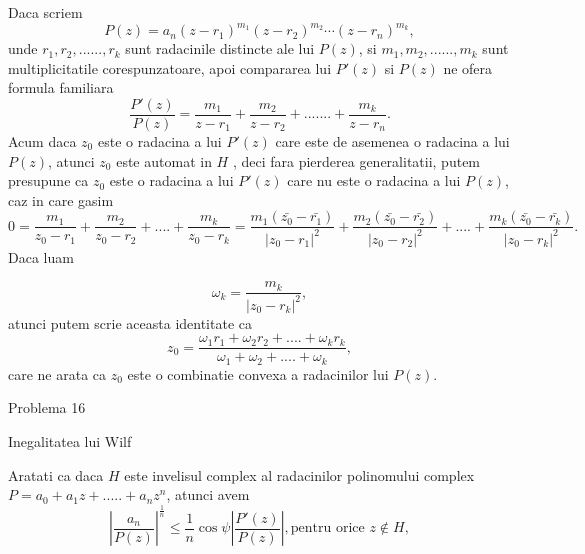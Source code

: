 \documentclass[a4paper,12pt,oneside]{report}
\begin{document}
Daca scriem 
\begin{displaymath}
  P\left ( z \right ) = a_{n}\left ( z - r_{1} \right )^{m_{1}}\left ( z - r_{2} \right )^{m_{2}}\cdots \left ( z - r_{n} \right )^{m_{k}},
\end{displaymath}
unde  \(r_{1} , r_{2}, ......, r_{k}\) sunt radacinile distincte ale lui \(P\left ( z \right )\), si \(m_{1} , m_{2}, ......, m_{k}\) sunt multiplicitatile corespunzatoare, apoi compararea lui \({P}'\left ( z \right )\) si \( P\left ( z \right )\) ne ofera formula familiara
\begin{displaymath}
  \frac{{P}'\left ( z \right ) }{P\left ( z \right )} = \frac{m_{1}}{z - r_{1}} + \frac{m_{2}}{z - r_{2}}+ .......+ \frac{m_{k}}{z - r_{n}} . 
\end{displaymath}
Acum daca \(z_{0}\) este o radacina a lui \({P}'\left ( z \right )\) care este de asemenea o radacina a lui \(P\left ( z \right )\), atunci \(z_{0}\) este automat in \(H\) , deci fara pierderea generalitatii, putem presupune ca \(z_{0}\)  este o radacina a lui  \({P}'\left ( z \right )\) care nu este o radacina a lui \(P\left ( z \right )\), caz in care gasim 
\begin{displaymath}
  0 = \frac{m_{1}}{z_{0} - r_{1}} + \frac{m_{2}}{z_{0} - r_{2}} +....+ \frac{m_{k}}{z_{0} - r_{k}} = \frac{m_{1}\left (\bar{z_{0}} - \bar{r_{1}}\right )}{\left | z_{0}  - r_{1}\right |^{2}} + \frac{m_{2}\left (\bar{z_{0}} - \bar{r_{2}}\right )}{\left | z_{0}  - r_{2}\right |^{2}} + ....+ \frac{m_{k}\left (\bar{z_{0}} - \bar{r_{k}}\right )}{\left | z_{0}  - r_{k}\right |^{2}}. 
\end{displaymath}
Daca luam 

\begin{displaymath}
  \omega _{k} =\frac{ m_{k}}{\left | z_{0}  - r_{k}\right |^{2}},
\end{displaymath} atunci putem scrie aceasta identitate ca 
\begin{displaymath}
  z_{0} = \frac{\omega _{1}r_{1} +\omega _{2}r{_2}+....+ \omega _{k}r{_k} }{\omega _{1} + \omega _{2} + .... + \omega _{k}}, 
\end{displaymath}
care ne arata ca \(z_{0}\) este o combinatie convexa a radacinilor lui \(P\left ( z \right )\). 


Problema 16 

Inegalitatea lui Wilf 

Aratati ca daca \(H\) este invelisul complex al radacinilor polinomului complex \(P = a_{0} + a_{1}z + ..... +a_{n}z^{n}\), atunci avem 
\begin{displaymath}
  \left | \frac{a_{n}}{P\left ( z \right )} \right |^{\frac{1}{n}}\leq \frac{1}n\cos{\psi }\left | \frac{{P}'\left ( z \right )}{P\left ( z \right )} \right | , \text{pentru orice } z\notin H, \label{eq:2.16} \tag{2.16}
\end{displaymath}
 
\end{document}

